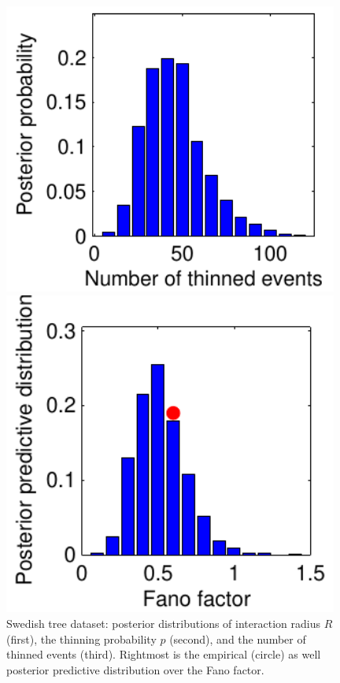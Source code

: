 \documentclass{statsoc}
\begin{document}
\begin{figure}
\begin{minipage}[b]{0.245\linewidth}
  \end{minipage}
  \begin{minipage}[b]{0.245\linewidth}
  \centering
    \includegraphics[width=0.98\textwidth]{figs/plot_swedish_num_prob.pdf} 
  \end{minipage}
  \begin{minipage}[b]{0.245\linewidth}
  \centering
    \includegraphics[width=0.98\textwidth]{figs/plot_swedish_postpred_fano_55_prob.pdf} 
  \end{minipage}
  \caption[Posterior distributions of the homogeneous \matern type-III model with probabilistic thinning for the Swedish pine tree dataset]
      {Swedish tree dataset: posterior distributions of interaction radius $R$ (first), the thinning probability $p$ (second), and the number
      of thinned events (third). Rightmost is the empirical (circle) as well posterior predictive distribution over the Fano factor.
  }
  \label{fig:swedish_prob}
  \end{figure}
\end{document}
